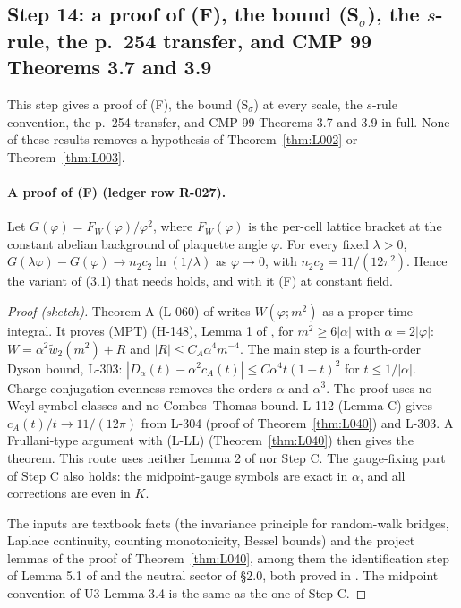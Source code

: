 \subsection{Step 14: a proof of (F), the bound (S$_\sigma$), the $s$-rule, the p.~254 transfer, and CMP 99 Theorems 3.7 and 3.9}\label{sec:src-r9}

This step gives a proof of (F), the bound (S$_\sigma$) at every scale, the $s$-rule convention, the p.~254 transfer, and CMP 99 Theorems 3.7 and 3.9 in full. None of these results removes a hypothesis of Theorem~\ref{thm:L002} or Theorem~\ref{thm:L003}.

\paragraph{A proof of (F) (ledger row R-027).}
\begin{theorem}\label{thm:L041}
Let $G(\varphi)=F_W(\varphi)/\varphi^2$, where $F_W(\varphi)$ is the per-cell lattice bracket at the constant abelian background of plaquette angle $\varphi$. For every fixed $\lambda>0$, $G(\lambda\varphi)-G(\varphi)\to n_2c_2\ln(1/\lambda)$ as $\varphi\to0$, with $n_2c_2=11/(12\pi^2)$. Hence the variant of (3.1) that  needs holds, and with it (F) at constant field.
\end{theorem}
\begin{proof}[Proof (sketch)]
Theorem A (L-060) of  writes $W(\varphi;m^2)$ as a proper-time integral. It proves (MPT) (H-148), Lemma 1 of , for $m^2\ge6|\alpha|$ with $\alpha=2|\varphi|$: $W=\alpha^2\tilde w_2(m^2)+R$ and $|R|\le C_A\alpha^4m^{-4}$. The main step is a fourth-order Dyson bound, L-303: $|D_\alpha(t)-\alpha^2c_A(t)|\le C\alpha^4t(1+t)^2$ for $t\le1/|\alpha|$. Charge-conjugation evenness removes the orders $\alpha$ and $\alpha^3$. The proof uses no Weyl symbol classes and no Combes--Thomas bound. L-112 (Lemma C) gives $c_A(t)/t\to11/(12\pi)$ from L-304 (proof of Theorem~\ref{thm:L040}) and L-303. A Frullani-type argument with (L-LL) (Theorem~\ref{thm:L040}) then gives the theorem. This route uses neither Lemma 2 of  nor Step C. The gauge-fixing part of Step C also holds: the midpoint-gauge symbols are exact in $\alpha$, and all corrections are even in $K$.

The inputs are textbook facts (the invariance principle for random-walk bridges, Laplace continuity, counting monotonicity, Bessel bounds) and the project lemmas of the proof of Theorem~\ref{thm:L040}, among them the identification step of Lemma 5.1 of  and the neutral sector of  \S2.0, both proved in . The midpoint convention of U3 Lemma 3.4 is the same as the one of Step C.
\end{proof}
